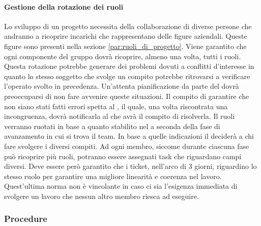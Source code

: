 
			\paragraph{Gestione della rotazione dei ruoli} %
			\label{par:gestione_della_rotazione_dei_ruoli}
			Lo sviluppo di un progetto necessita della collaborazione di diverse persone che andranno a ricoprire incarichi che rappresentano delle figure aziendali. Queste figure sono presenti nella sezione \ref{par:ruoli_di_progetto}. \newline
			Viene garantito che ogni componente del gruppo \groupName{} dovrà ricoprire, almeno una volta, tutti i ruoli. Questa rotazione potrebbe generare dei problemi dovuti a conflitti d'interesse in quanto lo stesso soggetto che svolge un compito potrebbe ritrovarsi a verificare l'operato svolto in precedenza. \newline
			Un'attenta pianificazione da parte del \roleProjectManager{} dovrà preoccuparsi di non fare avvenire queste situazioni. \newline
			Il compito di garantire che non siano stati fatti errori spetta al \roleVerifier, il quale, una volta riscontrata una incongruenza, dovrà notificarla al \roleProjectManager{} che avrà il compito di risolverla. \newline \newline
			Il ruoli verranno ruotati in base a quanto stabilito nel \docNameVersionPdP{} a seconda della fase di avanzamento in cui si trova il team. In base a quelle indicazioni il \roleProjectManager{} deciderà a chi fare svolgere i diversi compiti. Ad ogni membro, siccome durante ciascuna fase può ricoprire più ruoli, potranno essere assegnati task che riguardano campi diversi. Deve essere però garantito che i ticket, nell'arco di 3 giorni, riguardino lo stesso ruolo per garantire una migliore linearità e coerenza nel lavoro. Quest'ultima norma non è vincolante in caso ci sia l'esigenza immediata di svolgere un lavoro che nessun altro membro riesca ad eseguire.

		\subsubsection{Procedure}
